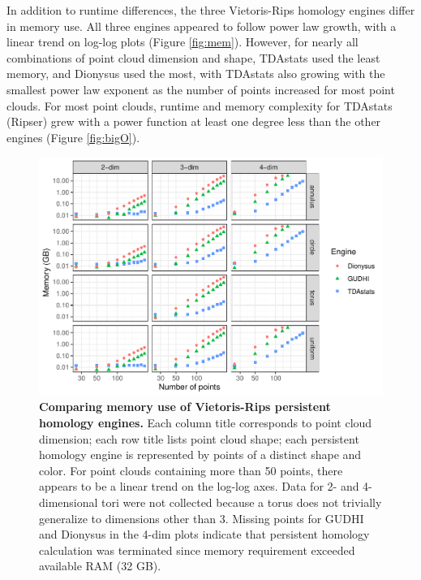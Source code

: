 In addition to runtime differences, the three Vietoris-Rips homology
engines differ in memory use. All three engines appeared to follow power
law growth, with a linear trend on log-log plots (Figure \ref{fig:mem}).
However, for nearly all combinations of point cloud dimension and shape,
TDAstats used the least memory, and Dionysus used the most, with TDAstats
also growing with the smallest power law exponent as the number of
points increased for most point clouds. For most point clouds, runtime
and memory complexity for TDAstats (Ripser) grew with a power function
at least one degree less than the other engines (Figure \ref{fig:bigO}).

\begin{Schunk}
\begin{figure}
\includegraphics{fig7.pdf} \caption{\label{fig:mem}\textbf{Comparing memory use of Vietoris-Rips persistent homology engines.} Each column title corresponds to point cloud dimension; each row title lists point cloud shape; each persistent homology engine is represented by points of a distinct shape and color. For point clouds containing more than 50 points, there appears to be a linear trend on the log-log axes. Data for 2- and 4-dimensional tori were not collected because a torus does not trivially generalize to dimensions other than 3. Missing points for GUDHI and Dionysus in the 4-dim plots indicate that persistent homology calculation was terminated since memory requirement exceeded available RAM (32 GB).}\label{fig:memory}
\end{figure}
\end{Schunk}

